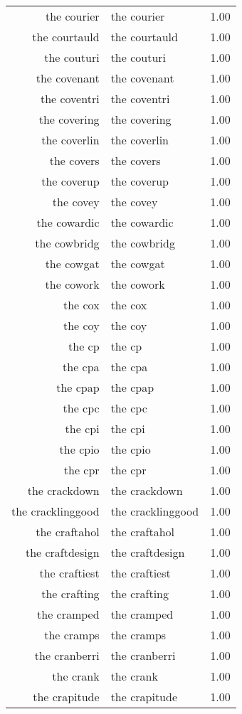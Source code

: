 \begin{table}[ht]
\begin{tabular}{rlr}
  the courier & the courier & 1.00 \\ 
  the courtauld & the courtauld & 1.00 \\ 
  the couturi & the couturi & 1.00 \\ 
  the covenant & the covenant & 1.00 \\ 
  the coventri & the coventri & 1.00 \\ 
  the covering & the covering & 1.00 \\ 
  the coverlin & the coverlin & 1.00 \\ 
  the covers & the covers & 1.00 \\ 
  the coverup & the coverup & 1.00 \\ 
  the covey & the covey & 1.00 \\ 
  the cowardic & the cowardic & 1.00 \\ 
  the cowbridg & the cowbridg & 1.00 \\ 
  the cowgat & the cowgat & 1.00 \\ 
  the cowork & the cowork & 1.00 \\ 
  the cox & the cox & 1.00 \\ 
  the coy & the coy & 1.00 \\ 
  the cp & the cp & 1.00 \\ 
  the cpa & the cpa & 1.00 \\ 
  the cpap & the cpap & 1.00 \\ 
  the cpc & the cpc & 1.00 \\ 
  the cpi & the cpi & 1.00 \\ 
  the cpio & the cpio & 1.00 \\ 
  the cpr & the cpr & 1.00 \\ 
  the crackdown & the crackdown & 1.00 \\ 
  the cracklinggood & the cracklinggood & 1.00 \\ 
  the craftahol & the craftahol & 1.00 \\ 
  the craftdesign & the craftdesign & 1.00 \\ 
  the craftiest & the craftiest & 1.00 \\ 
  the crafting & the crafting & 1.00 \\ 
  the cramped & the cramped & 1.00 \\ 
  the cramps & the cramps & 1.00 \\ 
  the cranberri & the cranberri & 1.00 \\ 
  the crank & the crank & 1.00 \\ 
  the crapitude & the crapitude & 1.00 \\ 

\end{tabular}
\end{table}
